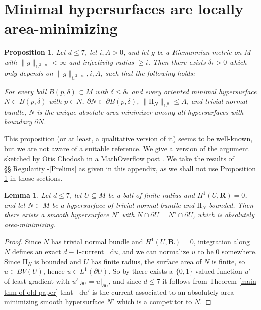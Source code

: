 \documentclass[reqno,11pt]{amsart}
\newcommand{\RR}{\mathbf{R}}
\newcommand*\dif{\mathop{}\!\mathrm{d}}
\newcommand{\Two}{\mathrm{I\!I}}
\newtheorem{lemma}[theorem]{Lemma}
\newtheorem{proposition}[theorem]{Proposition}
\theoremstyle{definition}
\numberwithin{equation}{section}
\begin{document}
\section{Minimal hypersurfaces are locally area-minimizing} \label{locally minimizing appendix}
\begin{proposition}\label{minimal implies locally minimizing}
Let $d \leq 7$, let $i, A > 0$, and let $g$ be a Riemannian metric on $M$ with $\|g\|_{C^{2 + \alpha}} < \infty$ and injectivity radius $\geq i$.
Then there exists $\delta_* > 0$ which only depends on $\|g\|_{C^{2 + \alpha}}, i, A$, such that the following holds:

For every ball $B(p, \delta) \subset M$ with $\delta \leq \delta_*$ and every oriented minimal hypersurface $N \subset B(p, \delta)$ with $p \in N$, $\partial N \subset \partial B(p, \delta)$, $\|\Two_N\|_{C^0} \leq A$, and trivial normal bundle, $N$ is the unique absolute area-minimizer among all hypersurfaces with boundary $\partial N$.
\end{proposition}

This proposition (or at least, a qualitative version of it) seems to be well-known, but we are not aware of a suitable reference.
We give a version of the argument sketched by Otis Chodosh in a MathOverflow post \cite{MathOverflowMinimalLocal}.
We take the results of \S\S\ref{Regularity}-\ref{Prelims} as given in this appendix, as we shall not use Proposition \ref{minimal implies locally minimizing} in those sections.

\begin{lemma}\label{existence of absolute minimizers}
Let $d \leq 7$, let $U \subseteq M$ be a ball of finite radius and $H^1(U, \RR) = 0$, and let $N \subset M$ be a hypersurface of trivial normal bundle and $\Two_N$ bounded.
Then there exists a smooth hypersurface $N'$ with $N \cap \partial U = N' \cap \partial U$, which is absolutely area-minimizing.
\end{lemma}
\begin{proof}
Since $N$ has trivial normal bundle and $H^1(U, \RR) = 0$, integration along $N$ defines an exact $d - 1$-current $\dif u$, and we can normalize $u$ to be $0$ somewhere.
Since $\Two_N$ is bounded and $U$ has finite radius, the surface area of $N$ is finite, so $u \in BV(U)$, hence $u \in L^1(\partial U)$.
So by \cite[Theorem 1.20]{Giusti77} there exists a $\{0, 1\}$-valued function $u'$ of least gradient with $u'|_{\partial U} = u|_{\partial U}$, and since $d \leq 7$ it follows from Theorem \ref{main thm of old paper} that $\dif u'$ is the current associated to an absolutely area-minimizing smooth hypersurface $N'$ which is a competitor to $N$.
\end{proof}
\end{document}
